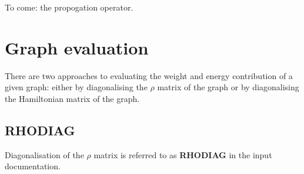 \documentclass[openany,a4paper,10pt]{manual}
\begin{document}
\begin{notice}[note]
To come: the propogation operator.
\end{notice}

\resetcurrentobjects


\hypertarget{theory-graph-evaluation}{}\section{Graph evaluation}

There are two approaches to evaluating the weight and energy contribution
of a given graph: either by diagonalising the $\rho$  matrix of
the graph or by diagonalising the Hamiltonian matrix of the graph.


\subsection{\textbf{RHODIAG}}

Diagonalisation of the $\rho$  matrix is referred to as \textbf{RHODIAG}
in the input documentation.
\end{document}
